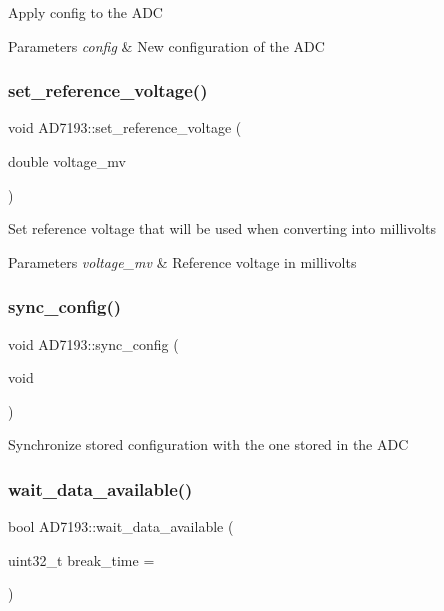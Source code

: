 Apply config to the A\+DC 
\begin{DoxyParams}{Parameters}
{\em config} & New configuration of the A\+DC \\
\hline
\end{DoxyParams}
\mbox{\label{classAD7193_ac9bf997384928f28bee7c6cdb784f4bb}} 
\subsubsection{\texorpdfstring{set\+\_\+reference\+\_\+voltage()}{set\_reference\_voltage()}}
{\footnotesize\ttfamily void A\+D7193\+::set\+\_\+reference\+\_\+voltage (\begin{DoxyParamCaption}\item[{double}]{voltage\+\_\+mv }\end{DoxyParamCaption})}

Set reference voltage that will be used when converting into millivolts 
\begin{DoxyParams}{Parameters}
{\em voltage\+\_\+mv} & Reference voltage in millivolts \\
\hline
\end{DoxyParams}
\mbox{\label{classAD7193_a5fa5a3b5bf71472df93bb413f20ca7b6}} 
\subsubsection{\texorpdfstring{sync\+\_\+config()}{sync\_config()}}
{\footnotesize\ttfamily void A\+D7193\+::sync\+\_\+config (\begin{DoxyParamCaption}\item[{void}]{ }\end{DoxyParamCaption})}

Synchronize stored configuration with the one stored in the A\+DC \mbox{\label{classAD7193_abbe6d0813d39dc3754c3f89abc81116a}} 
\subsubsection{\texorpdfstring{wait\+\_\+data\+\_\+available()}{wait\_data\_available()}}
{\footnotesize\ttfamily bool A\+D7193\+::wait\+\_\+data\+\_\+available (\begin{DoxyParamCaption}\item[{uint32\+\_\+t}]{break\+\_\+time = {} }\end{DoxyParamCaption})}

